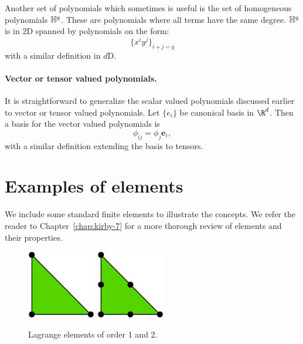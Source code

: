 Another set of polynomials which sometimes is useful is the set
of homogeneous polynomials ${\mathbb H}^q$. These are polynomials where all terms
have the same degree. ${\mathbb H}^q$ is in 2D spanned by polynomials on the
form:
\begin{equation}
\{ x^i y^j \}_{i+j=q} 
\end{equation}
with a similar definition in $d$D.



\paragraph{Vector or tensor valued polynomials.}
It is straightforward to generalize the scalar valued polynomials discussed
earlier to vector or tensor valued polynomials. Let $\{e_i\}$ be canonical
basis in $\R^d$. Then a basis for the vector valued polynomials is
\[
\phi_{ij} = \phi_j \mathbf{e}_i,
\]
with a similar definition extending the basis to tensors.


\section{Examples of elements}

We include some standard finite elements to illustrate the concepts. 
We refer the reader to Chapter~\ref{chap:kirby-7} for a more thorough review of
elements and their properties. 

\begin{figure}
  \begin{center}
    \includegraphics[height=3cm]{chapters/kirby-6/pdf/P1.pdf} \hspace{1.0cm}
    \includegraphics[height=3cm]{chapters/kirby-6/pdf/P2.pdf} \hspace{1.0cm}
    \caption{Lagrange elements of order 1 and 2.}
    \label{Lagrange}
  \end{center}
\end{figure}

